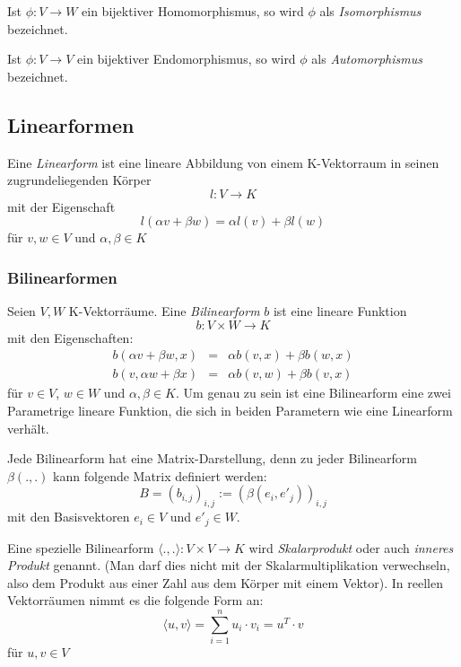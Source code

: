 \begin{definition}
Ist $\phi : V\longrightarrow W$ ein bijektiver Homomorphismus, so wird $\phi$ als \textsl{Isomorphismus} bezeichnet.
\end{definition}

\begin{definition}
Ist $\phi : V\longrightarrow V$ ein bijektiver Endomorphismus,  so wird $\phi$ als \textsl{Automorphismus} bezeichnet.
\end{definition}

\subsection{Linearformen}

\begin{definition}
Eine \textsl{Linearform}  ist eine lineare Abbildung von einem K-Vektorraum in seinen zugrundeliegenden Körper
\[
l : V \longrightarrow K
\]
mit der Eigenschaft
\[l(\alpha v + \beta w) = \alpha l(v) + \beta l(w) \]
für $v,w\in V$ und $\alpha, \beta \in K$
\end{definition}

\subsubsection{Bilinearformen}

\begin{definition}
Seien $V,W$ K-Vektorräume. Eine \textsl{Bilinearform} $b$ ist eine lineare Funktion
\[
	b : V \times W \longrightarrow K
\]
mit den Eigenschaften:
\begin{eqnarray*}
b(\alpha v + \beta w,x) &=& \alpha b(v,x) + \beta b(w,x) \\
b(v,\alpha w + \beta x) &=& \alpha b(v,w) + \beta b(v,x) 
\end{eqnarray*}
für $v\in V$, $w\in W$ und $\alpha, \beta \in K$. Um genau zu sein ist eine Bilinearform eine zwei Parametrige lineare Funktion, die sich in beiden Parametern wie eine Linearform verhält.
\end{definition}

Jede Bilinearform hat eine Matrix-Darstellung, denn zu jeder Bilinearform $\beta(.,.)$ kann folgende Matrix definiert werden:
\[
B = (b_{i,j})_{i,j} := (\beta(e_i, e'_j))_{i,j}
\]
mit den Basisvektoren $e_i\in V$ und $e'_j\in W$.

\begin{definition}
Eine spezielle Bilinearform $\langle .,.\rangle : V\times V \longrightarrow K$ wird \textsl{Skalarprodukt} oder auch \textsl{inneres Produkt} genannt. (Man darf dies nicht mit der Skalarmultiplikation verwechseln, also dem Produkt aus einer Zahl aus dem Körper mit einem Vektor). In reellen Vektorräumen nimmt es die folgende Form an:
\[
\langle u,v \rangle = \sum_{i=1}^{n} u_i\cdot v_i = u^T \cdot v
\]
für $u,v \in V$
\end{definition}

